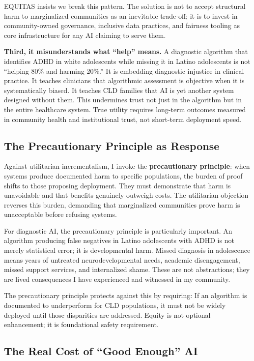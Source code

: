 \documentclass[12pt,a4paper]{article}
\begin{document}
EQUITAS insists we break this pattern. The solution is not to accept structural harm to marginalized communities as an inevitable trade-off; it is to invest in community-owned governance, inclusive data practices, and fairness tooling as core infrastructure for any AI claiming to serve them.

\textbf{Third, it misunderstands what ``help'' means.} A diagnostic algorithm that identifies ADHD in white adolescents while missing it in Latino adolescents is not ``helping 80\% and harming 20\%.'' It is embedding diagnostic injustice in clinical practice. It teaches clinicians that algorithmic assessment is objective when it is systematically biased. It teaches CLD families that AI is yet another system designed without them. This undermines trust not just in the algorithm but in the entire healthcare system. True utility requires long-term outcomes measured in community health and institutional trust, not short-term deployment speed.

\subsection{The Precautionary Principle as Response}

Against utilitarian incrementalism, I invoke the \textbf{precautionary principle}: when systems produce documented harm to specific populations, the burden of proof shifts to those proposing deployment. They must demonstrate that harm is unavoidable and that benefits genuinely outweigh costs. The utilitarian objection reverses this burden, demanding that marginalized communities prove harm is unacceptable before refusing systems.

For diagnostic AI, the precautionary principle is particularly important. An algorithm producing false negatives in Latino adolescents with ADHD is not merely statistical error; it is developmental harm. Missed diagnosis in adolescence means years of untreated neurodevelopmental needs, academic disengagement, missed support services, and internalized shame. These are not abstractions; they are lived consequences I have experienced and witnessed in my community.

The precautionary principle protects against this by requiring: If an algorithm is documented to underperform for CLD populations, it must not be widely deployed until those disparities are addressed. Equity is not optional enhancement; it is foundational safety requirement.

\subsection{The Real Cost of ``Good Enough'' AI}
\end{document}
